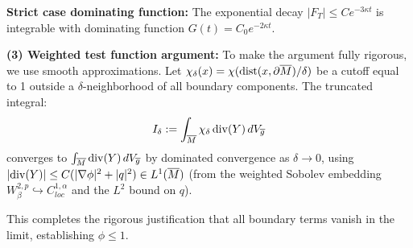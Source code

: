 \begin{remark}
\textbf{Strict case dominating function:} The exponential decay $|F_T| \le C e^{-3\kappa t}$ is integrable with dominating function $G(t) = C_0 e^{-2\kappa t}$.

\textbf{(3) Weighted test function argument:}
To make the argument fully rigorous, we use smooth approximations. Let $\chi_\delta(x) = \chi(\text{dist}(x, \partial\overline{M})/\delta)$ be a cutoff equal to 1 outside a $\delta$-neighborhood of all boundary components. The truncated integral:
\[
    I_\delta := \int_{\overline{M}} \chi_\delta \, \mathrm{div}(Y) \, dV_{\overline{g}}
\]
converges to $\int_{\overline{M}} \mathrm{div}(Y) \, dV_{\overline{g}}$ by dominated convergence as $\delta \to 0$, using $|\mathrm{div}(Y)| \le C(|\nabla\phi|^2 + |q|^2) \in L^1(\overline{M})$ (from the weighted Sobolev embedding $W^{2,p}_\beta \hookrightarrow C^{1,\alpha}_{loc}$ and the $L^2$ bound on $q$).

This completes the rigorous justification that all boundary terms vanish in the limit, establishing $\phi \le 1$.
\end{remark}

